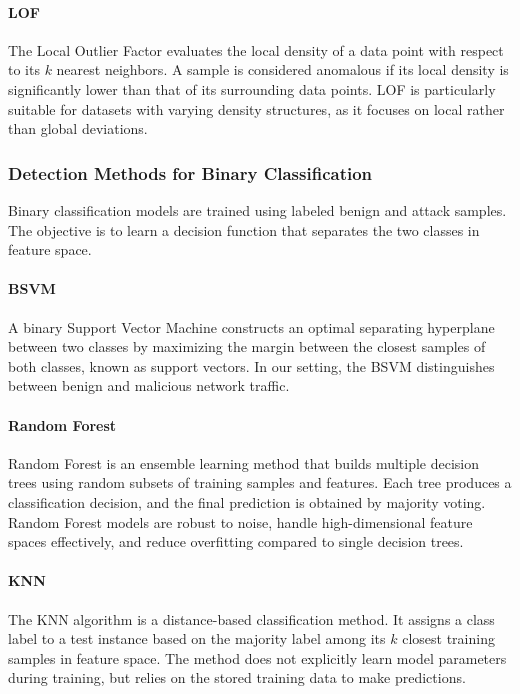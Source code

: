 \paragraph{\ac{LOF}}

The Local Outlier Factor evaluates the local density of a data point
with respect to its $k$ nearest neighbors. A sample is considered
anomalous if its local density is significantly lower than that of
its surrounding data points. LOF is particularly suitable for datasets
with varying density structures, as it focuses on local rather than
global deviations.~\cite{aggarwal2017}

\subsubsection{Detection Methods for Binary Classification}

Binary classification models are trained using labeled benign and
attack samples. The objective is to learn a decision function that
separates the two classes in feature space.

\paragraph{\ac{BSVM}}

A binary Support Vector Machine constructs an optimal separating
hyperplane between two classes by maximizing the margin between
the closest samples of both classes, known as support vectors.
In our setting, the \ac{BSVM} distinguishes between benign and
malicious network traffic.~\cite{hastie2009}

\paragraph{Random Forest}

Random Forest is an ensemble learning method that builds multiple
decision trees using random subsets of training samples and features.
Each tree produces a classification decision, and the final prediction
is obtained by majority voting. Random Forest models are robust to
noise, handle high-dimensional feature spaces effectively, and
reduce overfitting compared to single decision trees.~\cite{hastie2009}

\paragraph{\ac{KNN}}

The \ac{KNN} algorithm is a distance-based classification
method. It assigns a class label to a test instance based on the
majority label among its $k$ closest training samples in feature space.
The method does not explicitly learn model parameters during training,
but relies on the stored training data to make predictions.~\cite{hastie2009}


